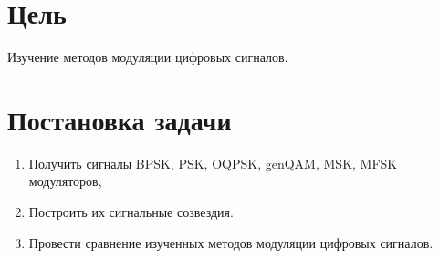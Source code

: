 \documentclass[a4paper]{article}
\begin{document}
\section{Цель}
Изучение методов модуляции цифровых сигналов.
\section{Постановка задачи}
\begin{enumerate}
    \item Получить сигналы BPSK, PSK, OQPSK, genQAM, MSK, MFSK модуляторов,
    \item Построить их сигнальные созвездия.
    \item Провести сравнение изученных методов модуляции цифровых сигналов.
\end{enumerate}
\end{document}
